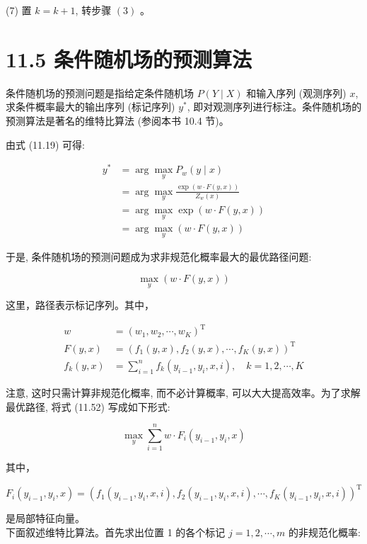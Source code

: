 \documentclass[10pt]{article}
\begin{document}
\begin{CJK*}{UTF8}{bsmi}
(7) 置 $k=k+1$, 转步骤 $(3)$ 。

\section*{11.5 条件随机场的预测算法}
条件随机场的预测问题是指给定条件随机场 $P(Y \mid X)$ 和输入序列 (观测序列) $x$, 求条件概率最大的输出序列 (标记序列) $y^{*}$, 即对观测序列进行标注。条件随机场的预测算法是著名的维特比算法 (参阅本书 10.4 节)。

由式 (11.19) 可得:

$$
\begin{aligned}
y^{*} & =\arg \max _{y} P_{w}(y \mid x) \\
& =\arg \max _{y} \frac{\exp (w \cdot F(y, x))}{Z_{w}(x)} \\
& =\arg \max _{y} \exp (w \cdot F(y, x)) \\
& =\arg \max _{y}(w \cdot F(y, x))
\end{aligned}
$$

于是, 条件随机场的预测问题成为求非规范化概率最大的最优路径问题:


\begin{equation*}
\max _{y}(w \cdot F(y, x)) \tag{11.52}
\end{equation*}


这里，路径表示标记序列。其中，

$$
\begin{aligned}
w & =\left(w_{1}, w_{2}, \cdots, w_{K}\right)^{\mathrm{T}} \\
F(y, x) & =\left(f_{1}(y, x), f_{2}(y, x), \cdots, f_{K}(y, x)\right)^{\mathrm{T}} \\
f_{k}(y, x) & =\sum_{i=1}^{n} f_{k}\left(y_{i-1}, y_{i}, x, i\right), \quad k=1,2, \cdots, K
\end{aligned}
$$

注意, 这时只需计算非规范化概率, 而不必计算概率, 可以大大提高效率。为了求解最优路径, 将式 (11.52) 写成如下形式:


\begin{equation*}
\max _{y} \sum_{i=1}^{n} w \cdot F_{i}\left(y_{i-1}, y_{i}, x\right) \tag{11.53}
\end{equation*}


其中，

$$
F_{i}\left(y_{i-1}, y_{i}, x\right)=\left(f_{1}\left(y_{i-1}, y_{i}, x, i\right), f_{2}\left(y_{i-1}, y_{i}, x, i\right), \cdots, f_{K}\left(y_{i-1}, y_{i}, x, i\right)\right)^{\mathrm{T}}
$$

是局部特征向量。\\
下面叙述维特比算法。首先求出位置 1 的各个标记 $j=1,2, \cdots, m$ 的非规范化概率:



\end{CJK*}
\end{document}
